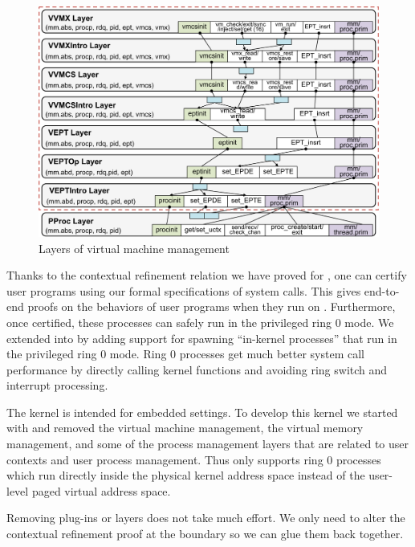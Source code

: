 {\begin{figure}
\includegraphics[scale=0.33]{figs/intel_layer}	
\caption{Layers of virtual machine management}
\label{fig:base:vm:layers}
\end{figure}

Thanks to the contextual refinement relation we have proved for
\cCTOSbase{}, one can certify user programs using our formal
specifications of system calls. This gives end-to-end proofs on
the behaviors of user programs when they run on \cCTOSbase{}.  
Furthermore, once certified, these processes can safely run in
the privileged ring 0 mode.  We extended \cCTOSbase{} into
\cCTOSringz{} by adding support for spawning ``in-kernel
processes'' that run in the privileged ring 0 mode. 
Ring 0 processes get much
better system call performance by directly calling kernel
functions and avoiding ring switch and interrupt processing. 

The \cCTOSembed{} kernel is intended for embedded settings. To develop
this kernel we started with \cCTOSringz{} and removed the virtual
machine management, the virtual memory management, and some of the
process management layers that are related to user contexts and user
process management.  Thus \cCTOSembed{} only supports ring 0 processes
which run directly inside the physical kernel address space instead of
the user-level paged virtual address space.

Removing plug-ins or layers does not take much effort.
We only need to alter the contextual refinement proof 
at the boundary so we can glue them back together.

}
